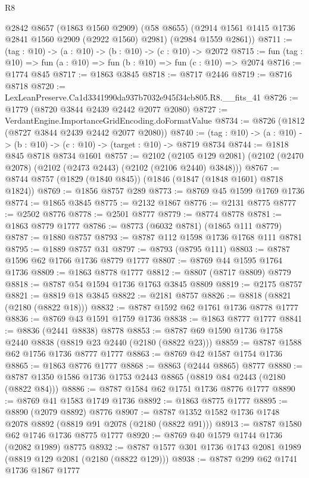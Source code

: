 \begin{lexlean}{R8}
\begin{coremodule}
      @2842
      @8657
      (@1863 @1560 @2909)
      (@58 @8655)
      (@2914 @1561 @1415 @1736 @2841 @1560 @2909 (@2922 @1560) @2981)
      (@2984 @1559 @2861))
@8711 := (tag : @10) -> (a : @10) -> (b : @10) -> (c : @10) -> @2072
@8715 := fun (tag : @10) => fun (a : @10) => fun (b : @10) => fun (c : @10) => @2074
@8716 := @1774 @845
@8717 := @1863 @3845
@8718 := @8717 @2446
@8719 := @8716 @8718
@8720 := LexLeanPreserve.Ca1d3341990da937b7032e945f34cb805.R8.__fits_41
@8726 := @1779 (@8720 @3844 @2439 @2442 @2077 @2080)
@8727 := VerdantEngine.ImportanceGridEncoding.doFormatValue
@8734 := @8726 (@1812 (@8727 @3844 @2439 @2442 @2077 @2080))
@8740 := (tag : @10) -> (a : @10) -> (b : @10) -> (c : @10) -> (target : @10) -> @8719 @8734
@8744 := @1818 @845 @8718 @8734 @1601
@8757 := @2102
    (@2105 @129 @2081)
    (@2102 (@2470 @2078) (@2102 (@2473 @2443) (@2102 (@2106 @2440) @3848)))
@8767 := @8744 @8757 (@1829 (@1840 @845)) (@1846 (@1847 (@1848 @1601) @8718 @1824))
@8769 := @1856 @8757 @289
@8773 := @8769 @45 @1599 @1769 @1736
@8774 := @1865 @3845
@8775 := @2132 @1867
@8776 := @2131 @8775
@8777 := @2502 @8776
@8778 := @2501 @8777
@8779 := @8774 @8778
@8781 := @1863 @8779 @1777
@8786 := @8773 (@6032 @8781) (@1865 @111 @8779)
@8787 := @1880 @8757
@8793 := @8787 @112 @1598 @1736 @1768 @111 @8781
@8795 := @1889 @8757 @31
@8797 := @8793 (@8795 @111)
@8803 := @8787 @1596 @62 @1766 @1736 @8779 @1777
@8807 := @8769 @44 @1595 @1764 @1736
@8809 := @1863 @8778 @1777
@8812 := @8807 (@8717 @8809) @8779
@8818 := @8787 @54 @1594 @1736 @1763 @3845 @8809
@8819 := @2175 @8757
@8821 := @8819 @18 @3845
@8822 := @2181 @8757
@8826 := @8818 (@8821 (@2180 (@8822 @18)))
@8832 := @8787 @1592 @62 @1761 @1736 @8778 @1777
@8836 := @8769 @43 @1591 @1759 @1736
@8838 := @1863 @8777 @1777
@8841 := @8836 (@2441 @8838) @8778
@8853 := @8787 @69 @1590 @1736 @1758 @2440 @8838 (@8819 @23 @2440 (@2180 (@8822 @23)))
@8859 := @8787 @1588 @62 @1756 @1736 @8777 @1777
@8863 := @8769 @42 @1587 @1754 @1736
@8865 := @1863 @8776 @1777
@8868 := @8863 (@2444 @8865) @8777
@8880 := @8787 @1350 @1586 @1736 @1753 @2443 @8865 (@8819 @84 @2443 (@2180 (@8822 @84)))
@8886 := @8787 @1584 @62 @1751 @1736 @8776 @1777
@8890 := @8769 @41 @1583 @1749 @1736
@8892 := @1863 @8775 @1777
@8895 := @8890 (@2079 @8892) @8776
@8907 := @8787 @1352 @1582 @1736 @1748 @2078 @8892 (@8819 @91 @2078 (@2180 (@8822 @91)))
@8913 := @8787 @1580 @62 @1746 @1736 @8775 @1777
@8920 := @8769 @40 @1579 @1744 @1736 (@2082 @1989) @8775
@8932 := @8787 @1577 @301 @1736 @1743 @2081 @1989 (@8819 @129 @2081 (@2180 (@8822 @129)))
@8938 := @8787 @299 @62 @1741 @1736 @1867 @1777

\end{coremodule}
\end{lexlean}

